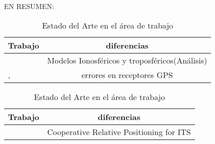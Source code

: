 \begin{WrapText}[ht]

EN RESUMEN:
\end{WrapText}


\begin{table}[ht]
	\centering
	\caption{Estado del Arte en el área de trabajo}
	\label{tab:estadoArte}
	
	\begin{tabular}{lc}
		\hline
		Trabajo&diferencias\\\hline
		 \cite{Hofmann_Wellenhof_1992} & Modelos Ionosféricos y troposféricos(Análisis) \\ 
		 \cite{de2007analise},\cite{Novatel:2015:Online} & errores en receptores GPS  \\
		\hline
	\end{tabular}
\end{table}


    \begin{table}[ht]
        \centering
        \caption{Estado del Arte en el área de trabajo}
        \label{tab:estadoArteRelacionados}
        \begin{tabular}{lc}
            \hline
            Trabajo&diferencias\\\hline
             \cite{Tang_2014} & Cooperative Relative Positioning for ITS \\
             \hline
        \end{tabular}
    \end{table}